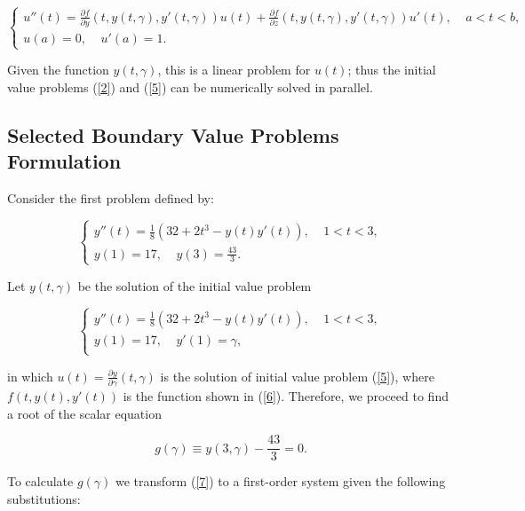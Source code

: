 \documentclass{article}
\begin{document}
    \begin{equation}\label{5}
        \begin{cases}
            u''(t)=\frac{\partial f}{\partial y}(t,y(t,\gamma),y'(t,\gamma))u(t)+\frac{\partial f}{\partial z}(t,y(t,\gamma),y'(t,\gamma))u'(t), \ \ \ \ \ a < t < b, \\
            u(a)=0, \ \ \ \ \ u'(a)=1.
        \end{cases}
    \end{equation}

Given the function $y(t,\gamma)$, this is a linear problem for $u(t)$; thus the initial value problems (\ref{2}) and (\ref{5}) can be numerically solved in parallel.

\subsection{Selected Boundary Value Problems Formulation}

Consider the first problem defined by:

\begin{equation}\label{6}
    \begin{cases}
        y''(t)=\frac{1}{8}(32+2t^3-y(t)y'(t)), \ \ \ \ \  1<t<3, \\
        y(1)=17, \ \ \ \ \ y(3)=\frac{43}{3}.
    \end{cases}
\end{equation} 

Let $y(t,\gamma)$ be the solution of the initial value problem

\begin{equation}\label{7}
    \begin{cases}
      y''(t)=\frac{1}{8}(32+2t^3-y(t)y'(t)), \ \ \ \ \ 1<t<3,\\
        y(1)=17, \ \ \ \ \ y'(1)=\gamma,\\
    \end{cases}
\end{equation}

in which $u(t)=\frac{\partial y}{\partial \gamma}(t, \gamma)$ is the solution of initial value problem (\ref{5}), where $f(t,y(t),y'(t))$ is the function shown in (\ref{6}). Therefore, we proceed to find a root of the scalar equation

\begin{equation}\label{8}
g(\gamma)\equiv y(3,\gamma)-\frac{43}{3}=0.
\end{equation}

To calculate $g(\gamma)$ we transform (\ref{7}) to a first-order system given the following substitutions:
\end{document}
